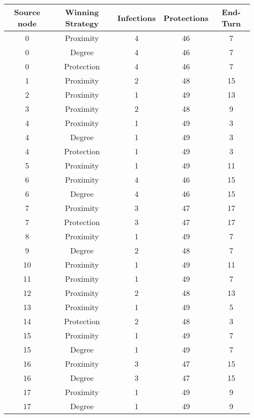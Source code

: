 \documentclass[results.tex]{subfiles}
\begin{document}
\begin{center}
  \begin{tabular}{| c || c | c | c | c |}
    \hline
    {\bfseries Source node} & {\bfseries Winning Strategy} & {\bfseries Infections} & {\bfseries Protections} & {\bfseries End-Turn} \\  %
    \hline\hline
    0 & Proximity & 4 & 46 & 7 \\ 
    \hline
    0 & Degree & 4 & 46 & 7 \\ 
    \hline
    0 & Protection & 4 & 46 & 7 \\ 
    \hline
    1 & Proximity & 2 & 48 & 15 \\ 
    \hline
    2 & Proximity & 1 & 49 & 13 \\ 
    \hline
    3 & Proximity & 2 & 48 & 9 \\ 
    \hline
    4 & Proximity & 1 & 49 & 3 \\ 
    \hline
    4 & Degree & 1 & 49 & 3 \\ 
    \hline
    4 & Protection & 1 & 49 & 3 \\ 
    \hline
    5 & Proximity & 1 & 49 & 11 \\ 
    \hline
    6 & Proximity & 4 & 46 & 15 \\ 
    \hline
    6 & Degree & 4 & 46 & 15 \\ 
    \hline
    7 & Proximity & 3 & 47 & 17 \\ 
    \hline
    7 & Protection & 3 & 47 & 17 \\ 
    \hline
    8 & Proximity & 1 & 49 & 7 \\ 
    \hline
    9 & Degree & 2 & 48 & 7 \\ 
    \hline
    10 & Proximity & 1 & 49 & 11 \\ 
    \hline
    11 & Proximity & 1 & 49 & 7 \\ 
    \hline
    12 & Proximity & 2 & 48 & 13 \\ 
    \hline
    13 & Proximity & 1 & 49 & 5 \\ 
    \hline
    14 & Protection & 2 & 48 & 3 \\ 
    \hline
    15 & Proximity & 1 & 49 & 7 \\ 
    \hline
    15 & Degree & 1 & 49 & 7 \\ 
    \hline
    16 & Proximity & 3 & 47 & 15 \\ 
    \hline
    16 & Degree & 3 & 47 & 15 \\ 
    \hline
    17 & Proximity & 1 & 49 & 9 \\ 
    \hline
    17 & Degree & 1 & 49 & 9 \\ 

\end{tabular}
\end{center}
\end{document}
